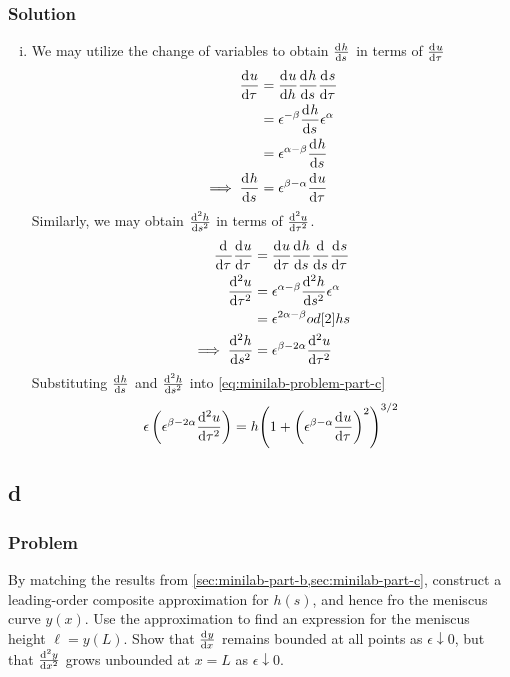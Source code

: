 \documentclass[12pt,twoside]{article}
\begin{document}
\subsubsection*{Solution}
\begin{enumerate}[(i)]
\item We may utilize the change of variables to obtain $\od{h}{s}$ in terms of
  $\od{u}{\tau}$
  \begin{equation*}
    \begin{aligned}
      \od{u}{\tau} &= \od{u}{h}\od{h}{s}\od{s}{\tau} \\
      &= \epsilon^{-\beta}\od{h}{s}\epsilon^{\alpha} \\
      &= \epsilon^{\alpha-\beta}\od{h}{s} \\
      \implies \od{h}{s} &= \epsilon^{\beta-\alpha}\od{u}{\tau} \\
    \end{aligned}
  \end{equation*}
  Similarly, we may obtain $\od[2]{h}{s}$ in terms of $\od[2]{u}{\tau}$.
  \begin{equation*}
    \begin{aligned}
      \od{}{\tau}\od{u}{\tau} &= \od{u}{\tau}\od{h}{s}\od{}{s}\od{s}{\tau} \\
      \od[2]{u}{\tau} &= \epsilon^{\alpha-\beta}\od[2]{h}{s}\epsilon^{\alpha} \\
      &= \epsilon^{2\alpha-\beta}od[2]{h}{s} \\
      \implies \od[2]{h}{s} &= \epsilon^{\beta-2\alpha}\od[2]{u}{\tau}
    \end{aligned}
  \end{equation*}
  Substituting $\od{h}{s}$ and $\od[2]{h}{s}$ into \cref{eq:minilab-problem-part-c}
  \begin{equation*}
    \epsilon\left(\epsilon^{\beta-2\alpha}\od[2]{u}{\tau}\right) =
    h{\left(1+{\left(\epsilon^{\beta-\alpha}\od{u}{\tau}\right)}^2\right)}^{3/2}
  \end{equation*}
\end{enumerate}

\subsection{d}
\label{sec:minilab-part-d}
\subsubsection*{Problem}
By matching the results from \cref{sec:minilab-part-b,sec:minilab-part-c},
construct a leading-order composite approximation for $h(s)$, and hence fro the
meniscus curve $y(x)$. Use the approximation to find an expression for the
meniscus height $\ell=y(L)$. Show that $\od{y}{x}$ remains bounded at all
points as $\epsilon\downarrow0$, but that $\od[2]{y}{x}$ grows unbounded at
$x=L$ as $\epsilon\downarrow0$.
\end{document}
